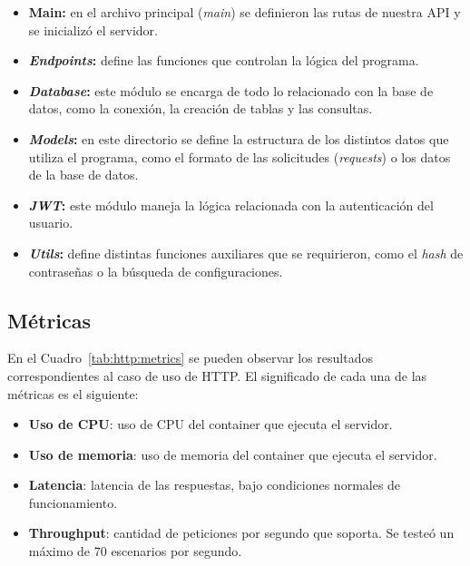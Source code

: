 \documentclass[11pt]{article}
\let\Oldsubsection\subsection
\renewcommand{\subsection}{\FloatBarrier\Oldsubsection}
\newcommand{\english}[1]{\textit{#1}}
\begin{document}
\begin{itemize}
    \item \textbf{Main:} en el archivo principal (\textit{main}) se definieron las rutas de nuestra API y se inicializó el servidor.
    
    \item \textbf{\textit{Endpoints}:} define las funciones que controlan la lógica del programa.
    
    \item \textbf{\textit{Database}:} este módulo se encarga de todo lo relacionado con la base de datos, como la conexión, la creación de tablas y las consultas.
    
    \item \textbf{\textit{Models}:} en este directorio se define la estructura de los distintos datos que utiliza el programa, como el formato de las solicitudes (\english{requests}) o los datos de la base de datos.
    
    \item \textbf{\textit{JWT}:} este módulo maneja la lógica relacionada con la autenticación del usuario.
    
    \item \textbf{\textit{Utils}:} define distintas funciones auxiliares que se requirieron, como el \english{hash} de contraseñas o la búsqueda de configuraciones.
\end{itemize}

\subsection{Métricas}

En el Cuadro~\ref{tab:http:metrics} se pueden observar los resultados correspondientes al caso de uso de HTTP. El significado de cada una de las métricas es el siguiente:

\begin{itemize}
    \item \textbf{Uso de CPU}: uso de CPU del container que ejecuta el servidor.
    \item \textbf{Uso de memoria}: uso de memoria del container que ejecuta el servidor.
    \item \textbf{Latencia}: latencia de las respuestas, bajo condiciones normales de funcionamiento.
    \item \textbf{Throughput}: cantidad de peticiones por segundo que soporta. Se testeó un máximo de 70 escenarios por segundo.
\end{itemize}
\end{document}
